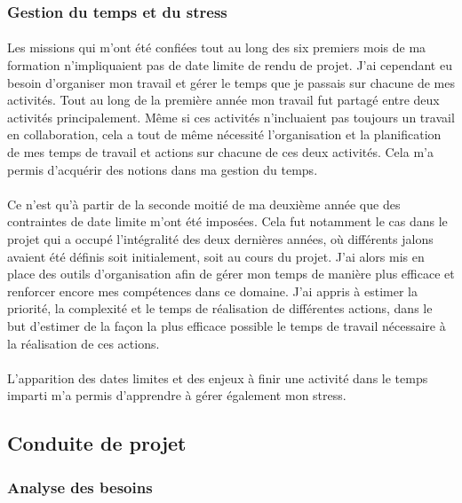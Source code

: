 \documentclass[12pt,a4paper]{report}
\begin{document}
\subsubsection{Gestion du temps et du stress}
\paragraph*{}Les missions qui m'ont été confiées tout au long des six premiers mois de ma formation n'impliquaient pas de date limite de rendu de projet. J'ai cependant eu besoin d'organiser mon travail et gérer le temps que je passais sur chacune de mes activités. Tout au long de la première année mon travail fut partagé entre deux activités principalement. Même si ces activités n'incluaient pas toujours un travail en collaboration, cela a tout de même nécessité l'organisation et la planification de mes temps de travail et actions sur chacune de ces deux activités. Cela m'a permis d'acquérir des notions dans ma gestion du temps.
\paragraph*{}Ce n'est qu'à partir de la seconde moitié de ma deuxième année que des contraintes de date limite m'ont été imposées. Cela fut notamment le cas dans le projet qui a occupé l'intégralité des deux dernières années, où différents jalons avaient été définis soit initialement, soit au cours du projet. J'ai alors mis en place des outils d’organisation afin de gérer mon temps de manière plus efficace et renforcer encore mes compétences dans ce domaine. J'ai appris à estimer la priorité, la complexité et le temps de réalisation de différentes actions, dans le but d’estimer de la façon la plus efficace possible le temps de travail nécessaire à la réalisation de ces actions.
\paragraph*{}L'apparition des dates limites et des enjeux à finir une activité dans le temps imparti m'a permis d'apprendre à gérer également mon stress. \\

\subsection{Conduite de projet}
\subsubsection{Analyse des besoins}
\end{document}
